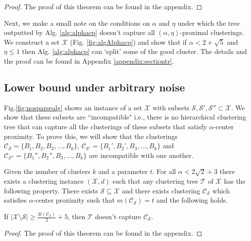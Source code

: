 \documentclass[anon,12pt]{colt2016} %
\newcommand{\mc}{\mathcal}
\begin{document}
\begin{proof}
	The proof of this theorem can be found in the appendix.
\end{proof}

Next, we make a small note on the conditions on $\alpha$ and $\eta$ under which the tree outputted by Alg. \ref{alg:alphacp} doesn't capture all $(\alpha, \eta)$-proximal clusterings. We construct a set $\mc X$ (Fig. \ref{fig:algAlphacp}) and show that if $\alpha < 2 + \sqrt{5}$ and $\eta \le 1$ then Alg. \ref{alg:alphacp} can `split' some of the good cluster. The details and the proof can be found in Appendix \ref{appendix:sectiontr}.
 
\subsection{Lower bound under arbitrary noise}
\label{section:alphaLowerBoundArbitrary}

Fig.\ref{fig:nosparsealg} shows an instance of a set $\mc X$ with subsets $\mc S, \mc S', \mc S'' \subset \mc X$. We show that these subsets are ``incompatible" i.e., there is no  hierarchical clustering tree that can capture all the clusterings of these subsets that satisfy $\alpha$-center proximity. To prove this, we will show that the clusterings $\mc C_{\mc S} = \{B_1, B_2, B_3, \ldots, B_k\}$, $\mc C_{\mc S'} = \{B_1', B_2', B_3, \ldots, B_k\}$ and $\mc C_{\mc S''} = \{B_1'', B_2'', B_3, \ldots, B_k\}$ are incompatible with one another.

\begin{theorem}
\label{thm:nosparsealg}
Given the number of clusters $k$ and a parameter $t$. For all $\alpha < 2\sqrt 2 + 3$ there exists a clustering instance $(\mc X, d)$ such that any clustering tree $\mc T$ of $\mc X$ has  the following property. There exists $\mc S \subseteq \mc X$ and there exists clustering $\mc C_{\mc S}$ which satisfies $\alpha$-center proximity such that $m(\mc C_{\mc S}) = t$ and the following holds. 

If $|\mc X \setminus \mc S| \ge \frac{3t(\mc C_{\mc S})}{2}+5$, then $\mc T$ doesn't capture $\mc C_{\mc S}$.
\end{theorem}

\begin{proof}
The proof of this theorem can be found in the appendix.
\end{proof}

\end{document}
